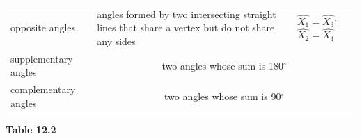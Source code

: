 {{\begin{center}
\begin{tabular}[t]{|l|l|l|}
    
        opposite angles &
    
    
        angles formed by two intersecting straight lines that share a vertex but do not share any sides &
    
    
        
                  \begin{math}\hat{{X}_{1}}=\hat{{X}_{3}}\end{math};
                  \begin{math}\hat{{X}_{2}}=\hat{{X}_{4}}\end{math}
     \tabularnewline\cline{1-1}\cline{2-2}\cline{3-3}
    
    
        supplementary angles &
    \multicolumn{2}{c|}{two angles whose sum is 180\begin{math}{}^{\circ }\end{math}}
     \tabularnewline\cline{1-1}\cline{2-2}\cline{3-3}
    
    
        complementary angles &
    \multicolumn{2}{c|}{two angles whose sum is 90\begin{math}{}^{\circ }\end{math}}
     \tabularnewline\cline{1-1}\cline{2-2}\cline{3-3}
    \end{tabular}
      \end{center}
    \begin{center}{\small\bfseries Table 12.2}\end{center}
    
}}
